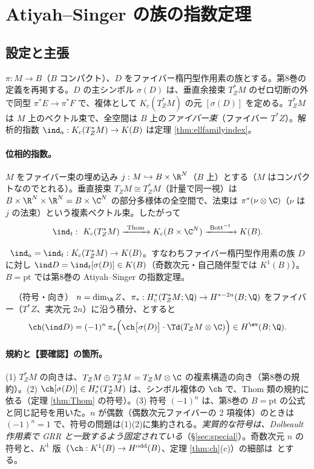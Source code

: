 
\section{Atiyah--Singer の族の指数定理}\label{sec:AS}
\subsection{設定と主張}
$\pi:M\to B$（$B$ コンパクト）、$D$ をファイバー楕円型作用素の族とする。第8巻の定義を再掲する。$D$ の主シンボル $\sigma(D)$ は、垂直余接束 $T^*_ZM$ のゼロ切断の外で同型 $\pi^*E\to\pi^*F$ で、複体として $K_c(T^*_ZM)$ の元 $[\sigma(D)]$ を定める。$T^*_ZM$ は $M$ 上のベクトル束で、全空間は $B$ 上の\emph{ファイバー束}（ファイバー $T^*Z$）。解析的指数 $\ind_a:K_c(T_Z^*M)\to K(B)$ は定理 \ref{thm:ellfamilyindex}。
\paragraph{位相的指数。}$M$ をファイバー束の埋め込み $j:M\hookrightarrow B\times\R^N$（$B$ 上）とする（$M$ はコンパクトなのでとれる）。垂直接束 $T_ZM\cong T^*_ZM$（計量で同一視）は $B\times\R^N\times\R^N=B\times\C^N$ の部分多様体の全空間で、法束は $\pi^*(\nu\otimes\C)$（$\nu$ は $j$ の法束）という複素ベクトル束。したがって
\[
\ind_t:\ K_c(T^*_ZM)\xrightarrow{\ \text{Thom}\ }K_c(B\times\C^N)\xrightarrow{\ \text{Bott}^{-1}\ }K(B).
\]
\begin{thm}\label{thm:ASfam}\tC\
$\ind_a=\ind_t:K_c(T^*_ZM)\to K(B)$。すなわちファイバー楕円型作用素の族 $D$ に対し $\ind D=\ind_t[\sigma(D)]\in K(B)$（奇数次元・自己随伴型では $K^1(B)$）。$B=\mathrm{pt}$ では第8巻の Atiyah--Singer の指数定理。
\end{thm}
\begin{thm}[コホモロジー版]\label{thm:ASfamch}\tC\ \tQ\ （符号・向き）
$n=\dim_{\R}Z$、$\pi_*:H_c^{*}(T^*_ZM;\Q)\to H^{*-2n}(B;\Q)$ をファイバー（$T^*Z$、実次元 $2n$）に沿う積分、とすると
\[
\ch(\ind D)=(-1)^n\,\pi_*\Bigl(\ch\bigl[\sigma(D)\bigr]\cdot\Td(T_ZM\otimes\C)\Bigr)\in H^{\ev}(B;\Q).
\]
\end{thm}
\paragraph{規約と【要確認】の箇所。}(1) $T^*_ZM$ の向きは、$T_ZM\oplus T^*_ZM=T_ZM\otimes\C$ の複素構造の向き（第8巻の規約）。(2) $\ch[\sigma(D)]\in H^*_c(T^*_ZM)$ は、シンボル複体の $\ch$ で、Thom 類の規約に依る（定理 \ref{thm:Thom} の符号）。(3) 符号 $(-1)^n$ は、第8巻の $B=\mathrm{pt}$ の公式と同じ記号を用いた。$n$ が偶数（偶数次元ファイバーの 2 項複体）のときは $(-1)^n=1$ で、符号の問題は(1)(2)に集約される。\emph{実質的な符号は、Dolbeault 作用素で GRR と一致するよう固定されている}（\S\ref{sec:special}）。奇数次元 $n$ の符号と、$K^1$ 版（$\ch:K^1(B)\to H^{\rm odd}(B)$、定理 \ref{thm:ch}(c)）の細部は\tQ\ とする。

